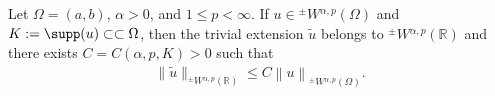 \documentclass[leqno,final]{siamltex}
\numberwithin{equation}{section}
\renewcommand{\(}{\bigl(}
\renewcommand{\)}{\bigr)}
\newcommand{\R}{\mathbb{R}}
\begin{document}
    \begin{lemma}\label{TrivialExtension}
        Let $\Omega=(a,b)$, $\alpha>0$, and $1 \leq p < \infty$. If $u \in {^{\pm}}{W}{^{\alpha,p}}(\Omega)$ and $K:=\supp(u) \subset\subset\Omega$, then the trivial extension $\tilde{u}$ belongs to ${^{\pm}}{W}{^{\alpha,p}}(\R)$ and there exists 
        $C = C(\alpha, p,K)>0$ such that
        \begin{align*}
            \|\tilde{u}\|_{{^{\pm}}{W}{^{\alpha,p}}(\R)} \leq C \left\|u\right\|_{{^{\pm}}{W}{^{\alpha, p}}(\Omega)}.
        \end{align*}
    \end{lemma}
 
\end{document}
